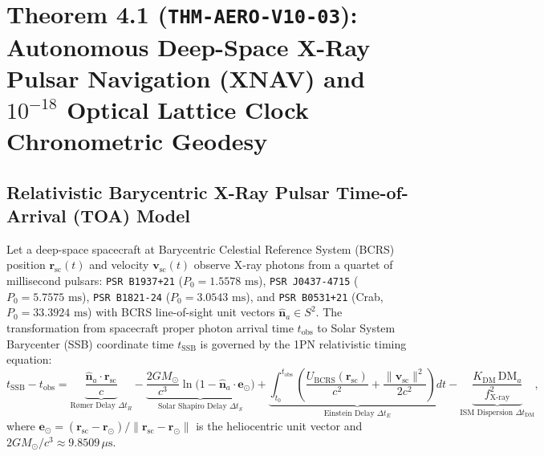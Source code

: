 \documentclass[11pt,a4paper]{article}
\theoremstyle{plain}
\theoremstyle{definition}
\theoremstyle{remark}
\begin{document}
\section{\texorpdfstring{Theorem 4.1 (\texttt{THM-AERO-V10-03}): Autonomous Deep-Space X-Ray Pulsar Navigation (XNAV) and $10^{-18}$ Optical Lattice Clock Chronometric Geodesy}{Theorem 4.1 (THM-AERO-V10-03): Autonomous Deep-Space X-Ray Pulsar Navigation (XNAV) and 10^-18 Optical Lattice Clock Chronometric Geodesy}}

\subsection{Relativistic Barycentric X-Ray Pulsar Time-of-Arrival (TOA) Model}

Let a deep-space spacecraft at Barycentric Celestial Reference System (BCRS) position $\mathbf{r}_{\text{sc}}(t)$ and velocity $\mathbf{v}_{\text{sc}}(t)$ observe X-ray photons from a quartet of millisecond pulsars: \texttt{PSR B1937+21} ($P_0 = 1.5578\text{ ms}$), \texttt{PSR J0437-4715} ($P_0 = 5.7575\text{ ms}$), \texttt{PSR B1821-24} ($P_0 = 3.0543\text{ ms}$), and \texttt{PSR B0531+21} (Crab, $P_0 = 33.3924\text{ ms}$) with BCRS line-of-sight unit vectors $\hat{\mathbf{n}}_a \in S^2$. The transformation from spacecraft proper photon arrival time $t_{\text{obs}}$ to Solar System Barycenter (SSB) coordinate time $t_{\text{SSB}}$ is governed by the 1PN relativistic timing equation:
\begin{equation}\label{eq:xnav_barycentric_toa}
  t_{\text{SSB}} - t_{\text{obs}} = \underbrace{\frac{\hat{\mathbf{n}}_a \cdot \mathbf{r}_{\text{sc}}}{c}}_{\text{R\o mer Delay }\Delta t_R} - \underbrace{\frac{2 G M_\odot}{c^3} \ln\!\bigl(1 - \hat{\mathbf{n}}_a \cdot \mathbf{e}_\odot\bigr)}_{\text{Solar Shapiro Delay }\Delta t_S} + \underbrace{\int_{t_0}^{t_{\text{obs}}} \left(\frac{U_{\text{BCRS}}(\mathbf{r}_{\text{sc}})}{c^2} + \frac{\|\mathbf{v}_{\text{sc}}\|^2}{2c^2}\right) dt}_{\text{Einstein Delay }\Delta t_E} - \underbrace{\frac{K_{\text{DM}}\,\text{DM}_a}{f_{\text{X-ray}}^2}}_{\text{ISM Dispersion }\Delta t_{\text{DM}}},
\end{equation}
where $\mathbf{e}_\odot = (\mathbf{r}_{\text{sc}} - \mathbf{r}_\odot)/\|\mathbf{r}_{\text{sc}} - \mathbf{r}_\odot\|$ is the heliocentric unit vector and $2GM_\odot/c^3 \approx 9.8509\,\mu\text{s}$.
\end{document}
